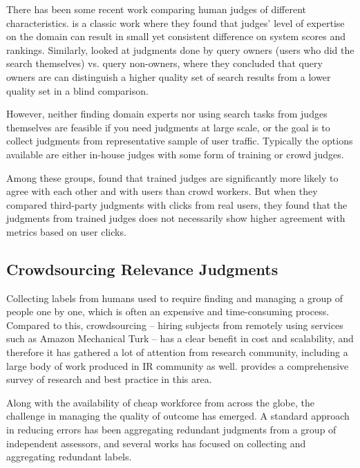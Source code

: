 There has been some recent work comparing human judges of different characteristics. \cite{Bailey:2008} is a classic work where they found that judges' level of expertise on the domain can result in small yet consistent difference on system scores and rankings. Similarly, \cite{Chouldechova:2013} looked at judgments done by query owners (users who did the search themselves) vs. query non-owners, where they concluded that query owners are can distinguish a higher quality set of search results from a lower quality set in a blind comparison.

However, neither finding domain experts nor using search tasks from judges themselves are feasible if you need judgments at large scale, or the goal is to collect judgments from representative sample of user traffic. Typically the options available are either in-house judges with some form of training or crowd judges. 

Among these groups,  \cite{Kazai:2013} found that trained judges are significantly more likely to agree with each other and with users than crowd workers. But when they compared third-party judgments with clicks from real users, they found that the judgments from trained judges does not necessarily show higher agreement with metrics based on user clicks.%

\subsection{Crowdsourcing Relevance Judgments}
\label{s-crowdsourcing}

Collecting labels from humans used to require finding and managing a group of people one by one, which is often an expensive and time-consuming process. Compared to this, crowdsourcing -- hiring subjects from remotely  using services such as Amazon Mechanical Turk -- has a clear benefit in cost and scalability, and  therefore it has gathered a lot of attention from research community, including a large body of work produced in IR community as well. \cite{Alonso2012} provides a comprehensive survey of research and best practice in this area. 

Along with the availability of cheap workforce from across the globe, the challenge in managing the quality of outcome has emerged. A standard approach in reducing errors has been aggregating redundant judgments from a group of independent assessors, and several works has focused on collecting and aggregating redundant labels. 

